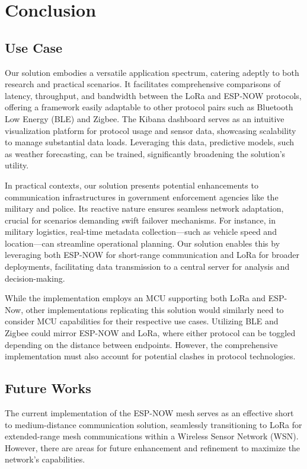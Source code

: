 \section{Conclusion}\label{sec:conclusion}

\subsection{Use Case}

Our solution embodies a versatile application spectrum, catering adeptly to both research and practical scenarios. It facilitates comprehensive comparisons of latency, throughput, and bandwidth between the LoRa and ESP-NOW protocols, offering a framework easily adaptable to other protocol pairs such as Bluetooth Low Energy (BLE) and Zigbee. The Kibana dashboard serves as an intuitive visualization platform for protocol usage and sensor data, showcasing scalability to manage substantial data loads. Leveraging this data, predictive models, such as weather forecasting, can be trained, significantly broadening the solution's utility.

In practical contexts, our solution presents potential enhancements to communication infrastructures in government enforcement agencies like the military and police. Its reactive nature ensures seamless network adaptation, crucial for scenarios demanding swift failover mechanisms. For instance, in military logistics, real-time metadata collection—such as vehicle speed and location—can streamline operational planning. Our solution enables this by leveraging both ESP-NOW for short-range communication and LoRa for broader deployments, facilitating data transmission to a central server for analysis and decision-making.

While the implementation employs an MCU supporting both LoRa and ESP-Now, other implementations replicating this solution would similarly need to consider MCU capabilities for their respective use cases. Utilizing BLE and Zigbee could mirror ESP-NOW and LoRa, where either protocol can be toggled depending on the distance between endpoints. However, the comprehensive implementation must also account for potential clashes in protocol technologies. 

\subsection{Future Works}

The current implementation of the ESP-NOW mesh serves as an effective short to medium-distance communication solution, seamlessly transitioning to LoRa for extended-range mesh communications within a Wireless Sensor Network (WSN). However, there are areas for future enhancement and refinement to maximize the network's capabilities.

